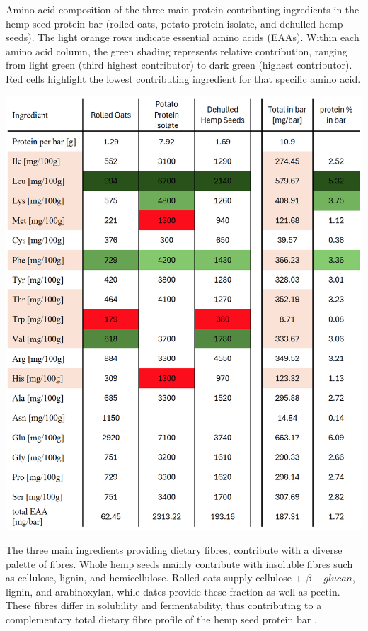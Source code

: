 \begin{table}
    \caption{Amino acid composition of the three main protein-contributing ingredients in the hemp seed protein bar (rolled oats, potato protein isolate, and dehulled hemp seeds). The light orange rows indicate essential amino acids (EAAs). Within each amino acid column, the green shading represents relative contribution, ranging from light green (third highest contributor) to dark green (highest contributor). Red cells highlight the lowest contributing ingredient for that specific amino acid.}
\label{tab:table_03_amino_acids}
\includegraphics[width=\linewidth]{Figures/tab_amino_acid_01.png}
\end{table} 

\vspace{1em}
The three main ingredients providing dietary fibres, contribute with a diverse palette of fibres. Whole hemp seeds mainly contribute with insoluble fibres such as cellulose, lignin, and hemicellulose. Rolled oats supply cellulose + $\beta-glucan$, lignin, and arabinoxylan, while dates provide these fraction as well as pectin. These fibres differ in solubility and fermentability, thus contributing to a complementary total dietary fibre profile of the hemp seed protein bar \cite*{art_15_df_research}.

